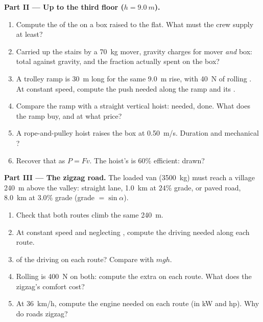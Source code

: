 \begin{problem}
\medskip
\noindent\textbf{Part II --- Up to the third floor ($h = \qty{9.0}{m}$).}
\begin{enumerate}[resume]
  \item Compute the  of the  on a box raised to the flat.
        What  must the crew supply at least?
  \item Carried up the stairs by a \qty{70}{kg} mover, gravity charges
        for mover \emph{and} box: total  against gravity, and the
        fraction actually spent on the box?
  \item A trolley ramp is \qty{30}{m} long for the same \qty{9.0}{m}
        rise, with \qty{40}{N} of rolling . At constant speed,
        compute the push needed along the ramp and its .
  \item Compare the ramp with a straight vertical hoist:  needed,
         done. What does the ramp buy, and at what price?
  \item A rope-and-pulley hoist raises the box at \qty{0.50}{m/s}.
        Duration and mechanical ?
  \item Recover that  as $P = Fv$. The hoist's  is $60\%$
        efficient:  drawn?
\end{enumerate}

\medskip
\noindent\textbf{Part III --- The zigzag road.}
The loaded van (\qty{3500}{kg}) must reach a village \qty{240}{m}
above the valley: straight lane, \qty{1.0}{km} at $24\%$ grade, or
paved road, \qty{8.0}{km} at $3.0\%$ grade (grade $= \sin\alpha$).
\begin{enumerate}[resume]
  \item Check that both routes climb the same \qty{240}{m}.
  \item At constant speed and neglecting , compute the driving
         needed along each route.
  \item {} of the driving  on each route? Compare with $mgh$.
  \item Rolling  is \qty{400}{N} on both: compute the extra
         on each route. What does the zigzag's comfort cost?
  \item At \qty{36}{km/h}, compute the engine  needed on each
        route (in \unit{kW} and \unit{hp}). Why do roads zigzag?
\end{enumerate}


\end{problem}
